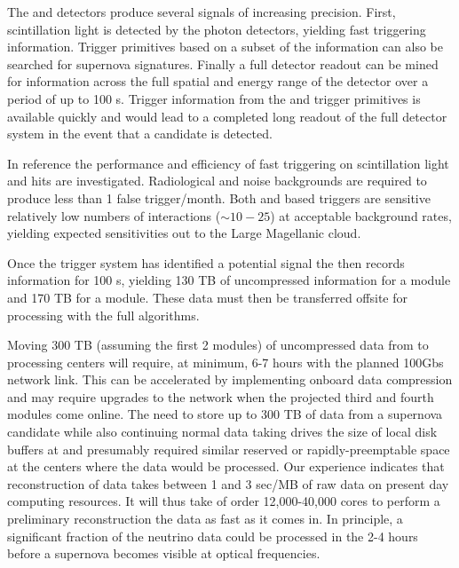 \documentclass[../main-v1.tex]{subfiles}
\begin{document}
The  and  detectors produce several signals of increasing precision.  First, scintillation light is detected by the photon detectors, yielding fast triggering information.  Trigger primitives based on a subset of the  information can also be searched for supernova signatures.  Finally a full detector readout can be mined for information across the full spatial and energy range of the detector over a period of up to 100 s.  Trigger information from the  and trigger primitives is available quickly and would lead to a completed long readout of the full detector system in the event that a candidate  is detected. 

In reference \cite{DUNE:2020zfm} the performance and efficiency of fast triggering on scintillation light and  hits are investigated.  Radiological and noise backgrounds are required to produce less than 1 false trigger/month. Both  and  based triggers are sensitive relatively low numbers of interactions ($\sim10-25$) at acceptable background rates, yielding expected sensitivities out to the Large Magellanic cloud.

Once the trigger system has identified a potential  signal  the  then records information for 100 s, yielding 130 TB of uncompressed information for a  module and 170 TB for a  module.  These data must then be transferred offsite for processing with the full algorithms. 




Moving  300 TB (assuming the first 2 modules) of uncompressed data   from  to processing centers will require, at minimum, 6-7 hours with the planned 100Gbs network link.  This can be accelerated by implementing onboard data compression and may require upgrades to the network when the projected third and fourth modules come online.  The need to store up to 300 TB of data from a supernova candidate while also continuing normal data taking drives the size of local disk buffers at  and presumably required similar reserved or rapidly-preemptable space at the centers where the data would be processed. Our  experience indicates that reconstruction of  data takes between 1 and 3 sec/MB of raw data on present day computing resources.  It will thus take of order 12,000-40,000 cores to perform a preliminary reconstruction the data as fast as it comes in. In principle, a significant fraction of the neutrino data could be processed  in the 2-4 hours before a supernova becomes visible at optical frequencies.
\end{document}
